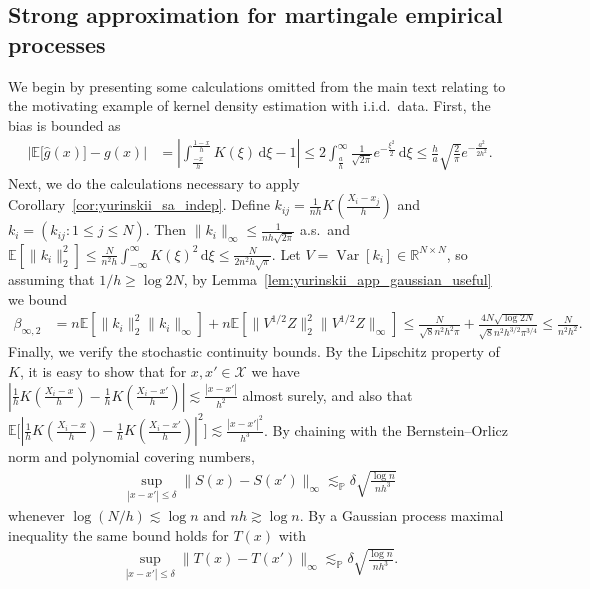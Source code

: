 \documentclass[11pt,lof]{puthesis}
\renewcommand{\P}{\ensuremath{\mathbb{P}}}
\newcommand{\R}{\ensuremath{\mathbb{R}}}
\newcommand{\E}{\ensuremath{\mathbb{E}}}
\newcommand{\cX}{\ensuremath{\mathcal{X}}}
\DeclareMathOperator{\Var}{Var}
\newcommand{\diff}[1]{\,\mathrm{d}#1}
\theoremstyle{break}
\theoremstyle{proof}
\begin{document}
\subsection{Strong approximation for martingale empirical processes}

We begin by presenting some calculations omitted from the main text
relating to the motivating example of kernel density estimation with
i.i.d.\ data.
First, the bias is bounded as
%
\begin{align*}
  \big| \E \big[ \hat g(x) \big] - g(x) \big|
  &=
  \left|
  \int_{\frac{-x}{h}}^{\frac{1-x}{h}}
  K(\xi)
  \diff \xi
  - 1
  \right|
  \leq
  2 \int_{\frac{a}{h}}^\infty
  \frac{1}{\sqrt{2 \pi}}
  e^{-\frac{\xi^2}{2}}
  \diff \xi
  \leq
  \frac{h}{a}
  \sqrt{\frac{2}{\pi}}
  e^{-\frac{a^2}{2 h^2}}.
\end{align*}
%
Next, we do the calculations necessary to apply
Corollary~\ref{cor:yurinskii_sa_indep}.
Define $k_{i j} = \frac{1}{n h} K \left( \frac{X_i - x_j}{h} \right)$ and
$k_i = (k_{i j} : 1 \leq j \leq N)$.
Then $\|k_i\|_\infty \leq \frac{1}{n h \sqrt{2 \pi}}$ a.s.\ and
$\E[\|k_i\|_2^2] \leq \frac{N}{n^2 h} \int_{-\infty}^\infty K(\xi)^2 \diff \xi
\leq \frac{N}{2 n^2 h \sqrt{\pi}}$.
Let $V = \Var[k_i] \in \R^{N \times N}$,
so assuming that $1/h \geq \log 2 N$,
by Lemma~\ref{lem:yurinskii_app_gaussian_useful} we bound
%
\begin{align*}
  \beta_{\infty,2}
  &=
  n \E\left[\| k_i \|^2_2 \| k_i \|_\infty
  \right]
  + n \E \left[ \|V^{1/2} Z \|^2_2 \|V^{1/2} Z \|_\infty \right]
  \leq
  \frac{N}{\sqrt{8} n^2 h^2 \pi}
  + \frac{4 N \sqrt{\log 2 N}}{\sqrt{8} n^2 h^{3/2} \pi^{3/4}}
  \leq
  \frac{N}{n^2 h^2}.
\end{align*}
%
Finally, we verify the stochastic continuity bounds.
By the Lipschitz property of $K$, it is easy to show that
for $x,x' \in \cX$ we have
$\left|\frac{1}{h} K \left( \frac{X_i - x}{h} \right)
- \frac{1}{h} K \left( \frac{X_i - x'}{h} \right)\right|
\lesssim \frac{|x-x'|}{h^2}$ almost surely, and also that
$\E \Big[ \left|\frac{1}{h} K \left( \frac{X_i - x}{h} \right)
- \frac{1}{h} K \left( \frac{X_i - x'}{h} \right)\right|^2 \Big]
\lesssim \frac{|x-x'|^2}{h^3}$.
By chaining with the Bernstein--Orlicz norm and polynomial covering numbers,
%
\begin{align*}
  \sup_{|x-x'| \leq \delta}
  \big\|S(x) - S(x')\big\|_\infty
  \lesssim_\P
  \delta
  \sqrt{\frac{\log n}{n h^3}}
\end{align*}
%
whenever $\log(N/h) \lesssim \log n$ and $n h \gtrsim \log n$.
By a Gaussian process maximal inequality
\citep[Corollary~2.2.8]{van1996weak}
the same bound holds for $T(x)$ with
%
\begin{align*}
  \sup_{|x-x'| \leq \delta}
  \big\|T(x) - T(x')\big\|_\infty
  \lesssim_\P
  \delta
  \sqrt{\frac{\log n}{n h^3}}.
\end{align*}
\end{document}
